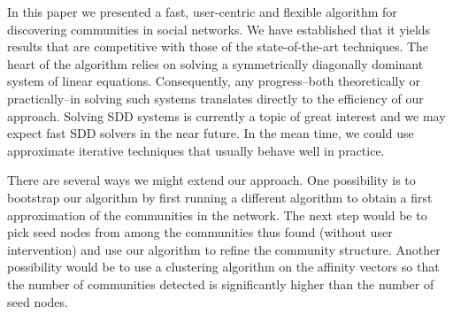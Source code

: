 In this paper we presented a fast, user-centric and flexible 
algorithm for discovering communities in social networks. 
We have established that it yields results that are competitive 
with those of the state-of-the-art techniques. The heart of the 
algorithm relies on solving a symmetrically diagonally dominant 
system of linear equations. Consequently, any progress--both theoretically 
or practically--in solving such systems translates directly 
to the efficiency of our approach. Solving SDD systems is currently a topic
of great interest and we may expect fast SDD solvers in the near future. 
In the mean time, we could use approximate iterative techniques that usually 
behave well in practice.

There are several ways we might extend our approach. One possibility is to 
bootstrap our algorithm by first running a different algorithm to obtain 
a first approximation of the communities in the network. The next step 
would be to pick seed nodes from among the communities thus found 
(without user intervention) and use our algorithm to refine 
the community structure. Another possibility would be to use a 
clustering algorithm on the affinity vectors so that the number of 
communities detected is significantly higher than the number of 
seed nodes. 







